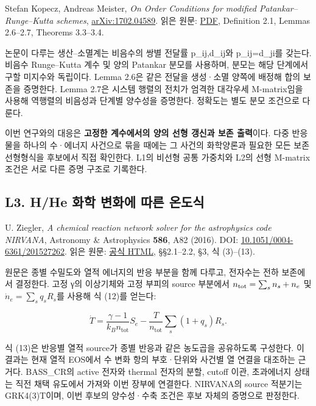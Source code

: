 \documentclass[11pt,a4paper]{article}
\begin{document}
Stefan Kopecz, Andreas Meister, \emph{On Order Conditions for modified Patankar--Runge--Kutta schemes}, \href{https://arxiv.org/abs/1702.04589}{arXiv:1702.04589}. 읽은 원문: \href{https://arxiv.org/pdf/1702.04589}{PDF}, Definition 2.1, Lemmas 2.6--2.7, Theorems 3.3--3.4.

논문이 다루는 생산--소멸계는 비음수의 쌍별 전달률 p\_ij,d\_ij와 p\_ij=d\_ji를 갖는다. 비음수 Runge--Kutta 계수 및 양의 Patankar 분모를 사용하며, 분모는 해당 단계에서 구할 미지수와 독립이다. Lemma 2.6은 같은 전달을 생성·소멸 양쪽에 배정해 합의 보존을 증명한다. Lemma 2.7은 시스템 행렬의 전치가 엄격한 대각우세 M-matrix임을 사용해 역행렬의 비음성과 단계별 양수성을 증명한다. 정확도는 별도 분모 조건으로 다룬다.

이번 연구와의 대응은 \textbf{고정한 계수에서의 양의 선형 갱신과 보존 출력}이다. 다중 반응물을 하나의 수·에너지 사건으로 묶을 때에는 그 사건의 화학양론과 필요한 모든 보존 선형형식을 후보에서 직접 확인한다. L1의 비선형 공통 가중치와 L2의 선형 M-matrix 조건은 서로 다른 증명 구조로 기록한다.

\hypertarget{l3.-hhe-uxd654uxd559-uxbcc0uxd654uxc5d0-uxb530uxb978-uxc628uxb3c4uxc2dd}{%
\subsection{L3. H/He 화학 변화에 따른 온도식}\label{l3.-hhe-uxd654uxd559-uxbcc0uxd654uxc5d0-uxb530uxb978-uxc628uxb3c4uxc2dd}}

U. Ziegler, \emph{A chemical reaction network solver for the astrophysics code NIRVANA}, Astronomy \& Astrophysics \textbf{586}, A82 (2016). DOI: \href{https://doi.org/10.1051/0004-6361/201527262}{10.1051/0004-6361/201527262}. 읽은 원문: \href{https://www.aanda.org/articles/aa/full_html/2016/02/aa27262-15/aa27262-15.html}{공식 HTML}, §§2.1--2.2, §3, 식 (3)--(13).

원문은 종별 수밀도와 열적 에너지의 반응 부분을 함께 다루고, 전자수는 전하 보존에서 결정한다. 고정 γ의 이상기체와 고정 부피의 source 부분에서 \(n_{\rm tot}=\sum_s n_s+n_e\) 및 \(\dot n_e=\sum_s q_s R_s\)를 사용해 식 (12)를 얻는다:

\[
\dot T=\frac{\gamma-1}{k_Bn_{\mathrm{tot}}}S_e-
\frac{T}{n_{\mathrm{tot}}}\sum_s(1+q_s)R_s.
\]

식 (13)은 반응별 열적 source가 종별 반응과 같은 농도곱을 공유하도록 구성한다. 이 결과는 현재 열적 EOS에서 수 변화 항의 부호·단위와 사건별 열 연결을 대조하는 근거다. BASS\_CR의 active 전자와 thermal 전자의 분할, cutoff 이관, 초과에너지 상태는 직전 채택 유도에서 가져와 이번 장부에 연결한다. NIRVANA의 source 적분기는 GRK4(3)T이며, 이번 후보의 양수성·수축 조건은 후보 자체의 증명으로 판정한다.
\end{document}
